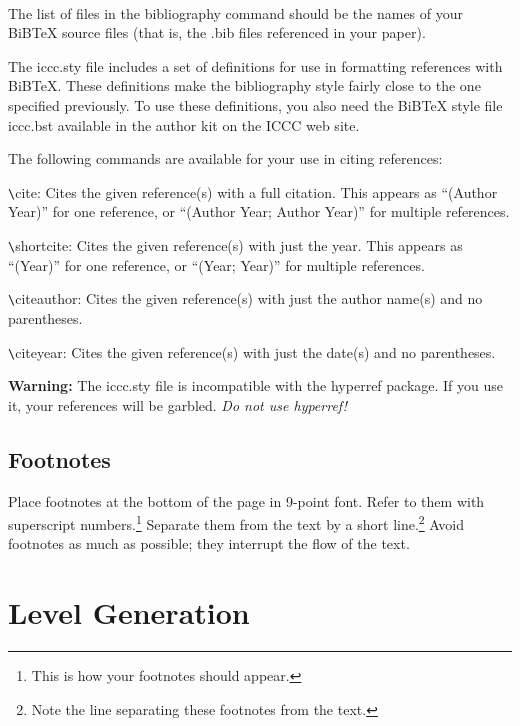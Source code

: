 \documentclass[letterpaper]{article}
\begin{document}
\begin{footnotesize}
\begin{verbatim}


\end{verbatim}
\end{footnotesize}

The list of files in the bibliography command should be the names of your BiBTeX source files (that is, the .bib files referenced in your paper).

The iccc.sty file includes a set of definitions for use in formatting references with BiBTeX. These definitions make the bibliography style fairly close to the one specified previously. To use these definitions, you also need the BiBTeX style file iccc.bst available in the author kit on the ICCC web site.

The following commands are available for your use in citing references:
\begin{description}
\item \verb+\+cite: Cites the given reference(s) with a full citation. This appears as ``(Author Year)'' for one reference, or ``(Author Year; Author Year)'' for multiple references.
\item \verb+\+shortcite: Cites the given reference(s) with just the year. This appears as ``(Year)'' for one reference, or ``(Year; Year)'' for multiple references.
\item \verb+\+citeauthor: Cites the given reference(s) with just the author name(s) and no parentheses.
\item \verb+\+citeyear: Cites the given reference(s) with just the date(s) and no parentheses.
\end{description}

{\bf Warning:} The iccc.sty file is incompatible with the hyperref package. If you use it, your references will be garbled. {\it Do not use hyperref!}

\subsection{Footnotes}
Place footnotes at the bottom of the page in 9-point font.  Refer to
them with superscript numbers.\footnote{This is how your footnotes
should appear.} Separate them from the text by a short
line.\footnote{Note the line separating these footnotes from the
text.} Avoid footnotes as much as possible; they interrupt the flow of
the text.

\section{Level Generation}
\end{document}
